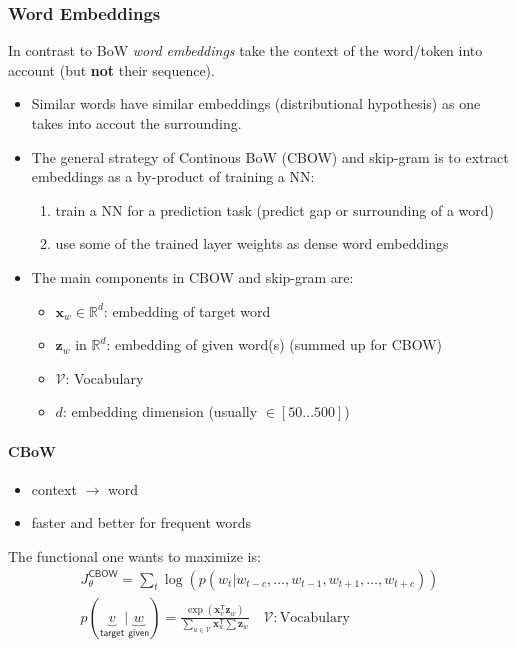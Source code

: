 \subsubsection{Word Embeddings}
In contrast to BoW \textit{word embeddings} take the context of the word/token into account (but \textbf{not} their sequence).
\begin{itemize}
    \item Similar words have similar embeddings (distributional hypothesis) as one takes into accout the surrounding.
    \item The general strategy of Continous BoW (CBOW) and skip-gram is to extract embeddings as a by-product of training a NN:
    \begin{enumerate}
        \item train a NN for a prediction task (predict gap or surrounding of a word)
        \item use some of the trained layer weights as dense word embeddings
    \end{enumerate}
    \item The main components in CBOW and skip-gram are:
    \begin{itemize}
        \item $\mathbf{x}_w \in \mathbb{R}^d$: embedding of target word
        \item $\mathbf{z} _w$ in $\mathbb{R}^d$: embedding of given word(s) (summed up for CBOW)
        \item $\mathcal{V}$: Vocabulary
        \item $d$: embedding dimension (usually $\in [50\dots500]$)
    \end{itemize}
\end{itemize}

\paragraph{CBoW}
\begin{itemize}
    \item context $\to$ word
    \item faster and better for frequent words
\end{itemize}

The functional one wants to maximize is:
\noindent\begin{gather*}
    J_\theta^{\mathsf{CBOW}}                                               = \sum_{t}\log\left(p(w_t|w_{t-c},\ldots, w_{t-1},w_{t+1},\ldots, w_{t+c})\right)                                   \\
    p(\underbrace{v}_{\textsf{target}} | \underbrace{w}_{\textsf{given}})  = \frac{\exp(\mathbf{x}_v^{\mathsf{T}}\mathbf{z}_w)}{\sum\limits_{u\in \mathcal{V}} \mathbf{x}_u^{\mathsf{T}}\sum\mathbf{z}_w} \quad \mathcal{V}: \text{Vocabulary}
\end{gather*}

